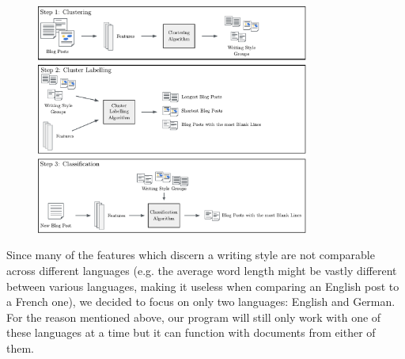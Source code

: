\begin{figure}[h]
    \centering
    \includegraphics[width=0.8\textwidth]{images/Figure_1.pdf}
    \caption{}
    \label{fig:naive}
\end{figure}


Since many of the features which discern a writing style are not comparable across different languages (e.g. the average word length might be vastly different between various languages, making it useless when comparing an English post to a French one), we decided to focus on only two languages: English and German.
For the reason mentioned above, our program will still only work with one of these languages at a time but it can function with documents from either of them.